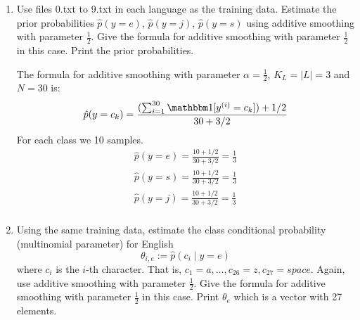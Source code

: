 \documentclass[a4paper]{article}
\theoremstyle{definition}
\def\ind{\mathbbm 1}
\newenvironment{soln}{
    \leavevmode\color{blue}\ignorespaces
}{}
\begin{document}
\begin{enumerate}
\item
Use files 0.txt to 9.txt in each language as the training data.
Estimate the prior probabilities 
$\hat p(y=e)$,
$\hat p(y=j)$,
$\hat p(y=s)$
using additive smoothing with parameter $\frac{1}{2}$. 
Give the formula for additive smoothing with parameter $\frac{1}{2}$ in this case. 
Print the prior probabilities.

\begin{soln}
The formula for additive smoothing with parameter $\alpha=\frac{1}{2}$, $K_L=|L|=3$ and $N=30$ is:
    $$
    \hat{p}(y = c_k) = \frac{(\sum_{i = 1}^{30}\ind [y^{(i)} = c_k]) + 1/2}{30 + 3/2}
    $$  
For each class we 10 samples.
    \begin{align*}
        \hat{p}(y = e) = \frac{10 + 1/2}{30 + 3/2} = \frac{1}{3} \\
        \hat{p}(y = s) = \frac{10 + 1/2}{30 + 3/2} = \frac{1}{3} \\
        \hat{p}(y = j) = \frac{10 + 1/2}{30 + 3/2} = \frac{1}{3} \\
    \end{align*}
\end{soln}

\item
Using the same training data, estimate the class conditional probability (multinomial parameter) for English
$$\theta_{i,e} := \hat p(c_i \mid y=e)$$ 
where $c_i$ is the $i$-th character. That is, $c_1 = a, \ldots, c_{26} = z, c_{27} = space$.
Again, use additive smoothing with parameter $\frac{1}{2}$.
Give the formula for additive smoothing with parameter $\frac{1}{2}$ in this case. 
Print $\theta_e$ which is a vector with 27 elements.


\end{enumerate}
\end{document}
